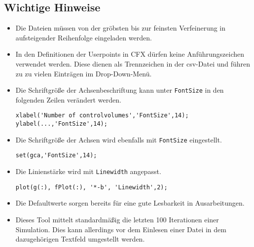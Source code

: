 \subsection{Wichtige Hinweise}
\lstset{language=Matlab}
\begin{itemize}
\item Die Dateien müssen von der gröbsten bis zur feinsten Verfeinerung in aufsteigender Reihenfolge eingeladen werden.
\item In den Definitionen der Userpoints in CFX dürfen keine Anführungszeichen verwendet werden. Diese dienen als Trennzeichen in der csv-Datei und führen zu zu vielen Einträgen im Drop-Down-Menü.
\item Die Schriftgröße der Achsenbeschriftung kann unter \texttt{FontSize} in den folgenden Zeilen verändert werden.
\begin{lstlisting}[frame=single]
xlabel('Number of controlvolumes','FontSize',14);
ylabel(...,'FontSize',14);
\end{lstlisting}
\item Die Schriftgröße der Achsen wird ebenfalls mit \texttt{FontSize} eingestellt.
\begin{lstlisting}[frame=single]
set(gca,'FontSize',14);
\end{lstlisting}
\item Die Linienstärke wird  mit \texttt{Linewidth} angepasst.
\begin{lstlisting}[frame=single]
plot(g(:), fPlot(:), '*-b', 'Linewidth',2);
\end{lstlisting}
\item Die Defaultwerte sorgen bereits für eine gute Lesbarkeit in Ausarbeitungen.
\item Dieses Tool mittelt standardmäßig die letzten 100 Iterationen einer Simulation. Dies kann allerdings vor dem Einlesen einer Datei in dem dazugehörigen Textfeld umgestellt werden. 
\end{itemize}

